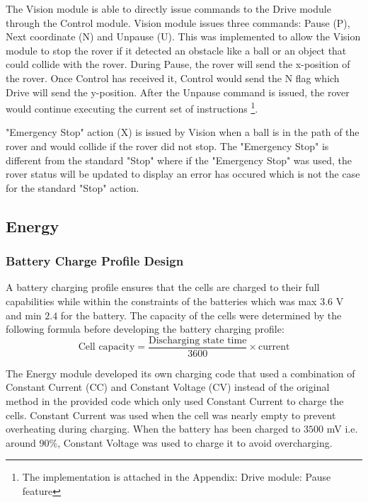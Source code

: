 \documentclass[11pt, a4paper]{article}
\begin{document}
The Vision module is able to directly issue commands to the Drive module through the Control module. Vision module issues three commands: Pause (P), Next coordinate (N) and Unpause (U). This was implemented to allow the Vision module to stop the rover if it detected an obstacle like a ball or an object that could collide with the rover. During Pause, the rover will send the x-position of the rover. Once Control has received it, Control would send the N flag which Drive will send the y-position. After the Unpause command is issued, the rover would continue executing the current set of instructions \footnote{The implementation is attached in the Appendix: Drive module: Pause feature}.
    
"Emergency Stop" action (X) is issued by Vision when a ball is in the path of the rover and would collide if the rover did not stop. The "Emergency Stop" is different from the standard "Stop" where if the "Emergency Stop" was used, the rover status will be updated to display an error has occured which is not the case for the standard "Stop" action. 


\vfill
\pagebreak
\subsection{Energy}
\subsubsection{Battery Charge Profile Design}

A battery charging profile ensures that the cells are charged to their full capabilities while within the constraints of the batteries which was max $3.6$ V and min $2.4$ for the battery. The capacity of the cells were determined by the following formula before developing the battery charging profile:
$$
\text{Cell capacity} = \frac{\text{Discharging state time}}{3600} \times \text{current}
$$

The Energy module developed its own charging code that used a combination of Constant Current (CC) and Constant Voltage (CV) instead of the original method in the provided code which only used Constant Current to charge the cells. Constant Current was used when the cell was nearly empty to prevent overheating during charging\cite{Energy_constant_current}. When the battery has been charged to $3500$ mV i.e. around 90\%, Constant Voltage was used to charge it to avoid overcharging. 
\end{document}
